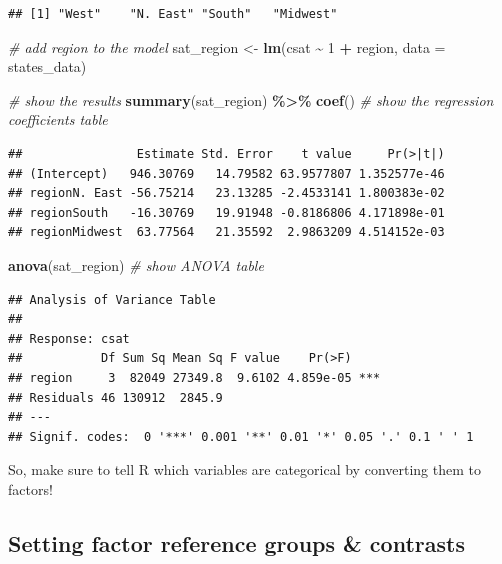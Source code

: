 \documentclass[
]{book}
\newenvironment{Shaded}{\begin{snugshade}}{\end{snugshade}}
\newcommand{\CommentTok}[1]{\textcolor[rgb]{0.56,0.35,0.01}{\textit{#1}}}
\newcommand{\DataTypeTok}[1]{\textcolor[rgb]{0.13,0.29,0.53}{#1}}
\newcommand{\DecValTok}[1]{\textcolor[rgb]{0.00,0.00,0.81}{#1}}
\newcommand{\KeywordTok}[1]{\textcolor[rgb]{0.13,0.29,0.53}{\textbf{#1}}}
\newcommand{\NormalTok}[1]{#1}
\newcommand{\OperatorTok}[1]{\textcolor[rgb]{0.81,0.36,0.00}{\textbf{#1}}}
\newcommand{\StringTok}[1]{\textcolor[rgb]{0.31,0.60,0.02}{#1}}
\begin{document}
\begin{verbatim}
## [1] "West"    "N. East" "South"   "Midwest"
\end{verbatim}

\begin{Shaded}
\begin{Highlighting}[]
  \CommentTok{\# add region to the model}
\NormalTok{  sat\_region \textless{}{-}}\StringTok{ }\KeywordTok{lm}\NormalTok{(csat }\OperatorTok{\textasciitilde{}}\StringTok{ }\DecValTok{1} \OperatorTok{+}\StringTok{ }\NormalTok{region, }\DataTypeTok{data =}\NormalTok{ states\_data) }

  \CommentTok{\# show the results}
  \KeywordTok{summary}\NormalTok{(sat\_region) }\OperatorTok{\%\textgreater{}\%}\StringTok{ }\KeywordTok{coef}\NormalTok{() }\CommentTok{\# show the regression coefficients table}
\end{Highlighting}
\end{Shaded}

\begin{verbatim}
##                Estimate Std. Error    t value     Pr(>|t|)
## (Intercept)   946.30769   14.79582 63.9577807 1.352577e-46
## regionN. East -56.75214   23.13285 -2.4533141 1.800383e-02
## regionSouth   -16.30769   19.91948 -0.8186806 4.171898e-01
## regionMidwest  63.77564   21.35592  2.9863209 4.514152e-03
\end{verbatim}

\begin{Shaded}
\begin{Highlighting}[]
  \KeywordTok{anova}\NormalTok{(sat\_region) }\CommentTok{\# show ANOVA table}
\end{Highlighting}
\end{Shaded}

\begin{verbatim}
## Analysis of Variance Table
## 
## Response: csat
##           Df Sum Sq Mean Sq F value    Pr(>F)    
## region     3  82049 27349.8  9.6102 4.859e-05 ***
## Residuals 46 130912  2845.9                      
## ---
## Signif. codes:  0 '***' 0.001 '**' 0.01 '*' 0.05 '.' 0.1 ' ' 1
\end{verbatim}

So, make sure to tell R which variables are categorical by converting them to factors!

\hypertarget{setting-factor-reference-groups-contrasts}{%
\subsection{Setting factor reference groups \& contrasts}\label{setting-factor-reference-groups-contrasts}}
\end{document}
